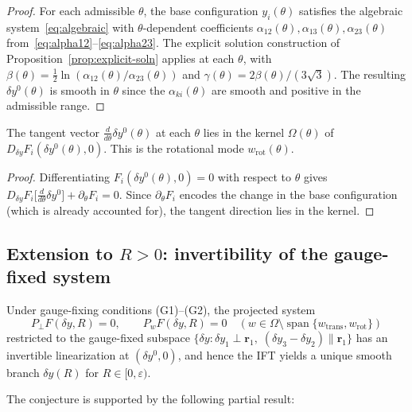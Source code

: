 \documentclass[11pt]{article}
\theoremstyle{plain}%
\theoremstyle{definition}%
\theoremstyle{definition}%
\theoremstyle{remark}%
\numberwithin{equation}{section}
\begin{document}
\begin{proof}
For each admissible $\theta$, the base configuration $y_i(\theta)$ satisfies the algebraic system~\eqref{eq:algebraic} with $\theta$-dependent coefficients $\alpha_{12}(\theta),\alpha_{13}(\theta),\alpha_{23}(\theta)$ from~\eqref{eq:alpha12}--\eqref{eq:alpha23}. The explicit solution construction of Proposition~\ref{prop:explicit-soln} applies at each $\theta$, with $\beta(\theta)=\frac{1}{2}\ln(\alpha_{12}(\theta)/\alpha_{23}(\theta))$ and $\gamma(\theta)=2\beta(\theta)/(3\sqrt{3})$. The resulting $\delta y^0(\theta)$ is smooth in $\theta$ since the $\alpha_{ki}(\theta)$ are smooth and positive in the admissible range.
\end{proof}

\begin{cor}\label{cor:tangent-kernel}
The tangent vector $\frac{d}{d\theta}\delta y^0(\theta)$ at each $\theta$ lies in the kernel $\Omega(\theta)$ of $D_{\delta y}F_i(\delta y^0(\theta),0)$. This is the rotational mode $w_{\mathrm{rot}}(\theta)$.
\end{cor}

\begin{proof}
Differentiating $F_i(\delta y^0(\theta),0)=0$ with respect to $\theta$ gives $D_{\delta y}F_i\bigl[\frac{d}{d\theta}\delta y^0\bigr] + \partial_\theta F_i = 0$. Since $\partial_\theta F_i$ encodes the change in the base configuration (which is already accounted for), the tangent direction lies in the kernel.
\end{proof}


\subsection{Extension to $R>0$: invertibility of the gauge-fixed system}\label{subsec:IFT}

\begin{conj}\label{conj:invertibility}
Under gauge-fixing conditions (G1)--(G2), the projected system
\[
P_\perp F(\delta y,R)=0, \qquad P_{w}F(\delta y,R)=0 \quad (w\in\Omega\setminus\operatorname{span}\{w_{\mathrm{trans}},w_{\mathrm{rot}}\})
\]
restricted to the gauge-fixed subspace $\{\delta y : \delta y_1\perp\boldsymbol{r}_1,\;(\delta y_3-\delta y_2)\parallel\boldsymbol{r}_1\}$ has an invertible linearization at $(\delta y^0,0)$, and hence the IFT yields a unique smooth branch $\delta y(R)$ for $R\in[0,\varepsilon)$.
\end{conj}

The conjecture is supported by the following partial result:
\end{document}
